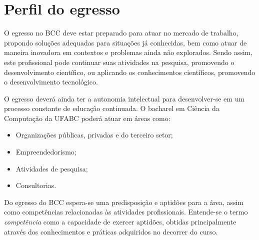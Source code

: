 \section{Perfil do egresso}
\label{sec:perfil_egresso}

O egresso no BCC deve estar preparado para atuar no mercado de trabalho,
propondo soluções adequadas para situações já conhecidas, bem como atuar de
maneira inovadora em contextos e problemas ainda não explorados.
Sendo assim, este profissional pode continuar suas atividades na pesquisa,
promovendo o desenvolvimento científico, ou aplicando os conhecimentos
científicos, promovendo o desenvolvimento tecnológico.

O egresso deverá ainda ter a autonomia intelectual para desenvolver-se em um
processo constante de educação continuada.
O bacharel em Ciência da Computação da UFABC poderá atuar em áreas como:
\begin{itemize}
    \item Organizações públicas, privadas e do terceiro setor;
    \item Empreendedorismo;
    \item Atividades de pesquisa;
    \item Consultorias.
\end{itemize}

Do egresso do BCC espera-se uma predisposição e aptidões para a área, assim
como competências relacionadas às atividades profissionais.
Entende-se o termo \textit{competência} como a capacidade de exercer aptidões,
obtidas principalmente através dos conhecimentos e práticas adquiridos no
decorrer do curso.

